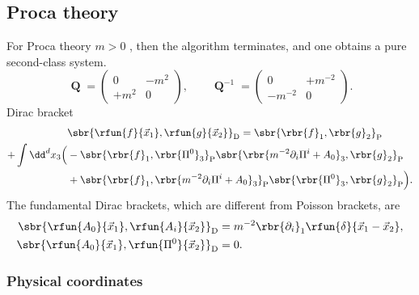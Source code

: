 \documentclass[a4paper,11pt]{article}
\begin{document}
\subsection{Proca theory}

For Proca theory $m > 0$ , then the algorithm terminates, and one obtains a 
pure second-class system.
\begin{equation}
\mbfQ = \begin{pmatrix}0 & -m^2 \\ +m^2 & 0\end{pmatrix},
\qquad
\mbfQ^{-1} = \begin{pmatrix}0 & +m^{-2} \\ -m^{-2} & 0\end{pmatrix}.
\end{equation}
Dirac bracket
\begin{equation}
\begin{split}
&\phantom{}
\sbr{\rfun{f}{\vec{x}_1},\rfun{g}{\vec{x}_2}}_\text{D} =
\sbr{\rbr{f}_1, \rbr{g}_2}_\text{P} \\
+ \int \dd^d x_3
\Bigl(&- \sbr{\rbr{f}_1, \rbr{\Pi^0}_3}_\text{P}
\sbr{\rbr{m^{-2}\partial_i \Pi^i + A_0}_3, \rbr{g}_2}_\text{P} \\
&+ \sbr{\rbr{f}_1, \rbr{m^{-2}\partial_i \Pi^i + A_0}_3}_\text{P}
\sbr{\rbr{\Pi^0}_3, \rbr{g}_2}_\text{P} \Bigr).
\end{split}
\end{equation}
The fundamental Dirac brackets, which are different from Poisson brackets, are
\begin{equation}
\begin{split}
\sbr{\rfun{A_0}{\vec{x}_1},\rfun{A_i}{\vec{x}_2}}_\text{D} &=
m^{-2} \rbr{\partial_i}_1 \rfun{\delta}{\vec{x}_1 - \vec{x}_2}, \\
\sbr{\rfun{A_0}{\vec{x}_1},\rfun{\Pi^0}{\vec{x}_2}}_\text{D} &= 0.
\end{split}
\end{equation}

\subsubsection{Physical coordinates}
\end{document}

